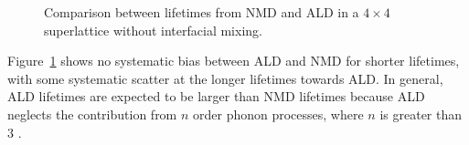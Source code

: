 \documentclass[aps,prb,preprint,preprintnumbers,amsmath,amssymb,floatfix,superscriptaddress]{revtex4}
\begin{document}
\begin{figure}%
\begin{center}
\renewcommand{\figure}{Fig.}
\caption{Comparison between lifetimes from NMD and ALD in a $4\times4$ superlattice without interfacial mixing.}
\label{FIG:NMD_v_ALD}
\end{center}
\end{figure}
Figure~\ref{FIG:NMD_v_ALD} shows no systematic bias between ALD and NMD for shorter lifetimes, with some systematic scatter at the longer lifetimes towards ALD. In general, ALD lifetimes are expected to be larger than NMD lifetimes because ALD neglects the contribution from $n$ order phonon processes, where $n$ is greater than 3 \cite{PhysRevB.79.064301} \cite{esfarjani2011heat}. 
\end{document}
